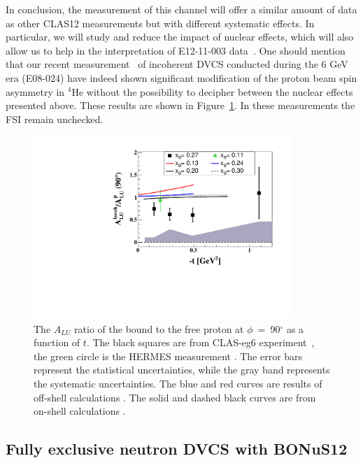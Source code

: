 In conclusion, the measurement of this channel will offer a similar amount of 
data as other CLAS12 measurements but with different systematic effects. In 
particular, we will study and reduce the impact of nuclear effects, which will 
also allow us to help in the interpretation of E12-11-003 
data~\cite{neutronDVCS}. One should mention that our recent 
measurement~\cite{Hattawy:2018liu} of incoherent DVCS conducted during the 6 
GeV era (E08-024) have indeed shown significant modification of the proton beam 
spin asymmetry in $^4$He without the possibility to decipher between the 
nuclear effects presented above. These results are shown in 
Figure~\ref{fig:incoh_EMC_ratio_ALU_proton}. In these measurements the FSI 
remain unchecked.

\begin{figure}[tb]
\centering
\includegraphics[width=9.8cm]{figures/ALU_ratioInc_t_shortscenrario-without-error-onX.pdf}
\caption{ The $A_{LU}$ ratio of the bound to the free proton at 
   $\phi$~=~90$^{\circ}$ as a function of $t$. The black squares are from 
   CLAS-eg6 experiment~\cite{Hattawy:2018liu}, the green circle is the HERMES 
   measurement \cite{Airapetian:2009cga}.  The error bars represent the 
   statistical uncertainties, while the gray band represents the systematic 
   uncertainties. The blue and red curves are results of off-shell calculations 
   \cite{Liuti:2005gi}. The solid and dashed black curves are from on-shell 
   calculations \cite{Guzey:2008fe}.} \label{fig:incoh_EMC_ratio_ALU_proton}
\end{figure}




\subsection{Fully exclusive neutron DVCS with BONuS12}

